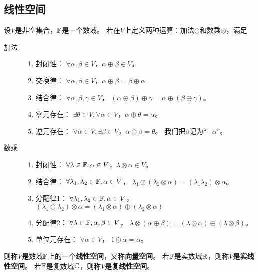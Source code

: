 \subsection{线性空间}
\begin{definition}[线性空间] \label{def-linear-space}
  设$V$是非空集合，$\mathbb{F}$是一个数域。
  若在$V$上定义两种运算：加法$\oplus$和数乘$\otimes$，满足
  \begin{description}
    \item[加法]
    \begin{enumerate}
      \item 封闭性：
      $\forall\alpha,\beta\in V$，$\alpha\oplus\beta\in V$。
      \item 交换律：
      $\forall\alpha,\beta\in V$，$\alpha\oplus\beta = \beta\oplus\alpha$
      \item 结合律：
      $\forall\alpha,\beta,\gamma\in V$，
      $(\alpha\oplus\beta)\oplus\gamma = \alpha\oplus(\beta\oplus\gamma)$。
      \item 零元存在：
      $\exists\theta\in V,\forall\alpha\in V$，$\alpha\oplus\theta=\alpha$。
      \item 逆元存在：
      $\forall\alpha\in V,\exists\beta\in V$，$\alpha\oplus\beta=\theta$。
      我们把$\beta$记为``$-\alpha$''。
    \end{enumerate}
    \item[数乘]
    \begin{enumerate}
      \item 封闭性：
      $\forall\lambda\in\mathbb{F},\alpha\in V$，$\lambda\otimes\alpha\in V$。
      \item 结合律：
      $\forall\lambda_1,\lambda_2\in\mathbb{F},\alpha\in V$，
      $\lambda_1\otimes(\lambda_2\otimes\alpha) =
        (\lambda_1\lambda_2)\otimes\alpha$。
      \item 分配律1：
      $\forall\lambda_1,\lambda_2\in\mathbb{F},\alpha\in V$，
      $(\lambda_1\oplus\lambda_2)\otimes\alpha =
        (\lambda_1\otimes\alpha)\oplus(\lambda_2\otimes\alpha)$
      \item 分配律2：
      $\forall\lambda\in\mathbb{F},\alpha,\beta\in V$，
      $\lambda\otimes(\alpha\oplus\beta) =
        (\lambda\otimes\alpha)\oplus(\lambda\otimes\beta)$。
      \item 单位元存在：
      $\forall\alpha\in V$，
      $1\otimes\alpha = \alpha$。
    \end{enumerate}
  \end{description}
  则称$V$是数域$\mathbb{F}$上的一个\textbf{线性空间}，又称\textbf{向量空间}。
  若$\mathbb{F}$是实数域$\mathbb{R}$，则称$V$是\textbf{实线性空间}。
  若$\mathbb{F}$是复数域$\mathbb{C}$，则称$V$是\textbf{复线性空间}。
\end{definition}


